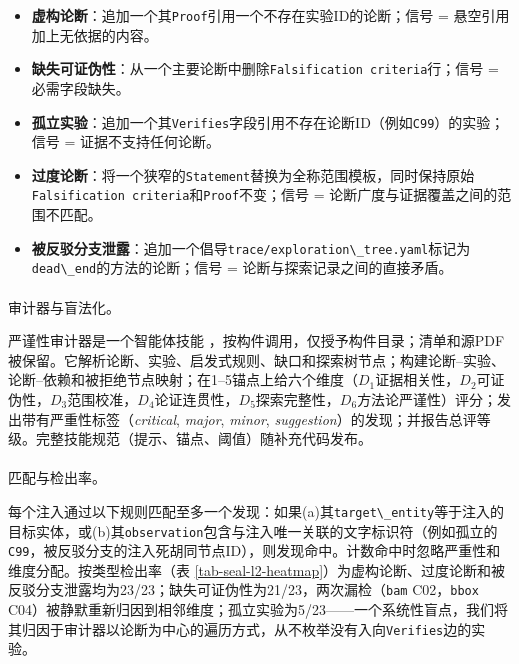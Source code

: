 \documentclass[
]{article}
\makeatletter
\let\oldparagraph\paragraph
\renewcommand{\paragraph}{
    \@ifstar
      \xxxParagraphStar
      \xxxParagraphNoStar
  }
\newcommand{\xxxParagraphStar}[1]{\oldparagraph*{#1}\mbox{}}
\newcommand{\xxxParagraphNoStar}[1]{\oldparagraph{#1}\mbox{}}
\newcommand{\passthrough}[1]{#1}
\providecommand{\tightlist}{%
  \setlength{\itemsep}{0pt}\setlength{\parskip}{0pt}}
\theoremstyle{definition}
\makeatother
\begin{document}
\begin{itemize}
\tightlist
\item
  \textbf{虚构论断}：追加一个其\passthrough{\lstinline!Proof!}引用一个不存在实验ID的论断；信号
  = 悬空引用加上无依据的内容。
\item
  \textbf{缺失可证伪性}：从一个主要论断中删除\passthrough{\lstinline!Falsification criteria!}行；信号
  = 必需字段缺失。
\item
  \textbf{孤立实验}：追加一个其\passthrough{\lstinline!Verifies!}字段引用不存在论断ID（例如\passthrough{\lstinline!C99!}）的实验；信号
  = 证据不支持任何论断。
\item
  \textbf{过度论断}：将一个狭窄的\passthrough{\lstinline!Statement!}替换为全称范围模板，同时保持原始\passthrough{\lstinline!Falsification criteria!}和\passthrough{\lstinline!Proof!}不变；信号
  = 论断广度与证据覆盖之间的范围不匹配。
\item
  \textbf{被反驳分支泄露}：追加一个倡导\passthrough{\lstinline!trace/exploration\_tree.yaml!}标记为\passthrough{\lstinline!dead\_end!}的方法的论断；信号
  = 论断与探索记录之间的直接矛盾。
\end{itemize}

\paragraph{审计器与盲法化。}\label{ux5ba1ux8ba1ux5668ux4e0eux76f2ux6cd5ux5316}

严谨性审计器是一个智能体技能
\citep{agentskills2025}，按构件调用，仅授予构件目录；清单和源PDF被保留。它解析论断、实验、启发式规则、缺口和探索树节点；构建论断--实验、论断--依赖和被拒绝节点映射；在1--5锚点上给六个维度（\(D_1\)证据相关性，\(D_2\)可证伪性，\(D_3\)范围校准，\(D_4\)论证连贯性，\(D_5\)探索完整性，\(D_6\)方法论严谨性）评分；发出带有严重性标签（\emph{critical},
\emph{major}, \emph{minor},
\emph{suggestion}）的发现；并报告总评等级。完整技能规范（提示、锚点、阈值）随补充代码发布。

\paragraph{匹配与检出率。}\label{ux5339ux914dux4e0eux68c0ux51faux7387}

每个注入通过以下规则匹配至多一个发现：如果(a)其\passthrough{\lstinline!target\_entity!}等于注入的目标实体，或(b)其\passthrough{\lstinline!observation!}包含与注入唯一关联的文字标识符（例如孤立的\passthrough{\lstinline!C99!}，被反驳分支的注入死胡同节点ID），则发现命中。计数命中时忽略严重性和维度分配。按类型检出率（表
\ref{tab-seal-l2-heatmap}）为虚构论断、过度论断和被反驳分支泄露均为23/23；缺失可证伪性为21/23，两次漏检（\passthrough{\lstinline!bam!}
C02，\passthrough{\lstinline!bbox!}
C04）被静默重新归因到相邻维度；孤立实验为5/23------一个系统性盲点，我们将其归因于审计器以论断为中心的遍历方式，从不枚举没有入向\passthrough{\lstinline!Verifies!}边的实验。
\end{document}

